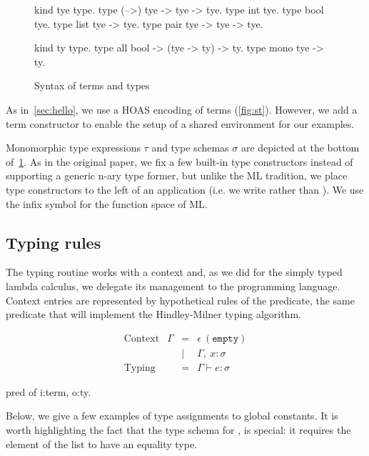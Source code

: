 \documentclass{these-ISSS}
\newenvironment{elpicode}
  {\VerbatimEnvironment\begin{elpibox}\begin{xelpicode}}{\end{xelpicode}
\end{elpibox}}
\begin{document}
\begin{figure}[!h]
\begin{center}
\begin{minipage}{0.64\textwidth}
\begin{elpicode}
kind tye   type.
type (-->) tye -> tye -> tye.  
type int   tye.
type bool  tye.
type list  tye -> tye.
type pair  tye -> tye -> tye.

kind ty     type.
type all    bool -> (tye -> ty) -> ty.
type mono   tye -> ty.
\end{elpicode}
\end{minipage}
\end{center}
\caption{Syntax of terms\label{fig:st} and types\label{fig:tt}}
\end{figure}
As in~\cref{sec:hello}, we use a HOAS encoding of terms (\cref{fig:st}). However, we add a
 term constructor to enable the setup of a shared environment
for our examples.

Monomorphic type expressions $\tau$ and type schemas $\sigma$ are depicted
at the bottom of~\cref{fig:tt}. As in the original paper, we fix a few built-in type constructors
instead of supporting a generic n-ary type former, but unlike the ML
tradition, we place type constructors to the left of an application (i.e.
we write  rather than ). We use
the infix symbol \elpi{-->} for the function space of ML.

\subsection{Typing rules}

The typing routine works with a context and, as we did for the simply typed
lambda calculus, we delegate its management to the programming language.
Context entries are represented by hypothetical rules of the 
predicate, the same predicate that will implement the Hindley-Milner
typing algorithm.
\begin{center}
\begin{minipage}{0.52\textwidth}
$$
\begin{array}{llrl}
    \text{Context}     & \Gamma & = & \epsilon\ \mathtt{(empty)}\\
                       &        & \vert& \Gamma,\ x : \sigma\\
    \text{Typing}      &        & = & \Gamma \vdash e : \sigma
  \end{array}
$$
\end{minipage}
\begin{minipage}{0.52\textwidth}
\begin{elpicode}
pred of i:term, o:ty.
~ ~
\end{elpicode}
\end{minipage}
\end{center}
Below, we give a few examples of type assignments to global constants. It is
worth highlighting the fact that the type schema for , is
special: it requires the element of the list to have an equality type.
\end{document}
